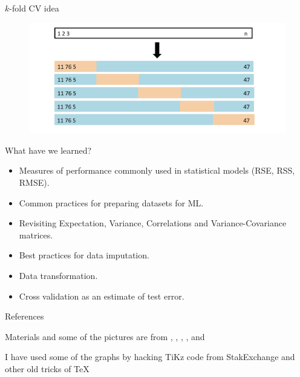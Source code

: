 \documentclass{beamer}
\begin{document}
\begin{frame}{$k$-fold CV idea}
	\begin{figure}
		\centering
		\includegraphics[scale=0.35]{../../Figures/fig_kfoldcv.png}
	\end{figure}	
\end{frame}

\begin{frame}{What have we learned?}
	\begin{itemize}
		\item Measures of performance commonly used in statistical models (RSE, RSS, RMSE).
		\item Common practices for preparing datasets for ML.
		\item Revisiting Expectation, Variance, Correlations and Variance-Covariance matrices.
		\item Best practices for data imputation.
		\item Data transformation.
		\item Cross validation as an estimate of test error. 
		
	\end{itemize}
\end{frame}


\begin{frame}{References}
	

Materials and some of the pictures are from \citep{James2015}, \citep{hastie01}, \citep{harrell}, \citep{kleinbaum}, and \citep{pestman}

\printbibliography 




I have used some of the graphs by hacking TiKz code from StakExchange and other old tricks of \TeX
\end{frame}		
\end{document}
